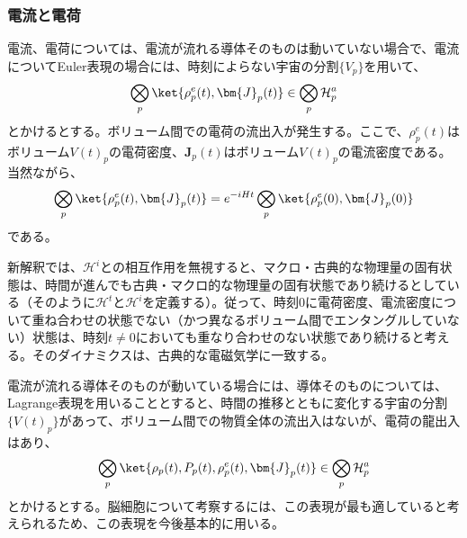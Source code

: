 \subsubsection{電流と電荷}
電流、電荷については、電流が流れる導体そのものは動いていない場合で、電流についてEuler表現の場合には、時刻によらない宇宙の分割$\{V_p\}$を用いて、
\begin{equation}
    \label{eq:electric_current_state}
    \bigotimes_p \ket{\rho^e_p(t),\bm{J}_p(t)} \in \bigotimes_p \mathcal{H}_p^a
\end{equation}
とかけるとする。ボリューム間での電荷の流出入が発生する。ここで、$\rho^e_p(t)$はボリューム$V(t)_p$の電荷密度、$\bm{J}_p(t)$はボリューム$V(t)_p$の電流密度である。
当然ながら、
\begin{equation}
    \bigotimes_p \ket{\rho^e_p(t),\bm{J}_p(t)} = e^{-iHt}\bigotimes_p \ket{\rho_p^e(0),\bm{J}_p(0)}
\end{equation}
である。\par
新解釈では、$\mathcal{H}^i$との相互作用を無視すると、マクロ・古典的な物理量の固有状態は、時間が進んでも古典・マクロ的な物理量の固有状態であり続けるとしている（そのように$\mathcal{H}^t$と$\mathcal{H}^i$を定義する）。従って、時刻$0$に電荷密度、電流密度について重ね合わせの状態でない（かつ異なるボリューム間でエンタングルしていない）状態は、時刻$t \neq 0$においても重なり合わせのない状態であり続けると考える。そのダイナミクスは、古典的な電磁気学に一致する。\par
電流が流れる導体そのものが動いている場合には、導体そのものについては、Lagrange表現を用いることとすると、時間の推移とともに変化する宇宙の分割$\{V(t)_p\}$があって、ボリューム間での物質全体の流出入はないが、電荷の龍出入はあり、
\begin{equation}
    \label{eq:electric_current_state}
    \bigotimes_p \ket{\rho_p(t),P_p(t),\rho^e_p(t),\bm{J}_p(t)} \in \bigotimes_p \mathcal{H}_p^a
\end{equation}
とかけるとする。脳細胞について考察するには、この表現が最も適していると考えられるため、この表現を今後基本的に用いる。